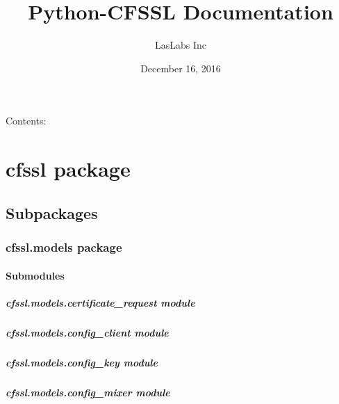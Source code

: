 \documentclass[letterpaper,10pt,english]{sphinxmanual}
\title{Python-CFSSL Documentation}
\date{December 16, 2016}
\author{LasLabs Inc}
\begin{document}
\maketitle
\tableofcontents
{}\label{index::doc}


Contents:


\chapter{cfssl package}
\label{cfssl:welcome-to-python-cfssl-s-documentation}\label{cfssl::doc}\label{cfssl:cfssl-package}

\section{Subpackages}
\label{cfssl:subpackages}

\subsection{cfssl.models package}
\label{cfssl.models::doc}\label{cfssl.models:cfssl-models-package}

\subsubsection{Submodules}
\label{cfssl.models:submodules}

\paragraph{cfssl.models.certificate\_request module}
\label{cfssl.models.certificate_request::doc}\label{cfssl.models.certificate_request:cfssl-models-certificate-request-module}

\paragraph{cfssl.models.config\_client module}
\label{cfssl.models.config_client:cfssl-models-config-client-module}\label{cfssl.models.config_client::doc}

\paragraph{cfssl.models.config\_key module}
\label{cfssl.models.config_key::doc}\label{cfssl.models.config_key:cfssl-models-config-key-module}

\paragraph{cfssl.models.config\_mixer module}
\label{cfssl.models.config_mixer::doc}\label{cfssl.models.config_mixer:cfssl-models-config-mixer-module}
\end{document}
